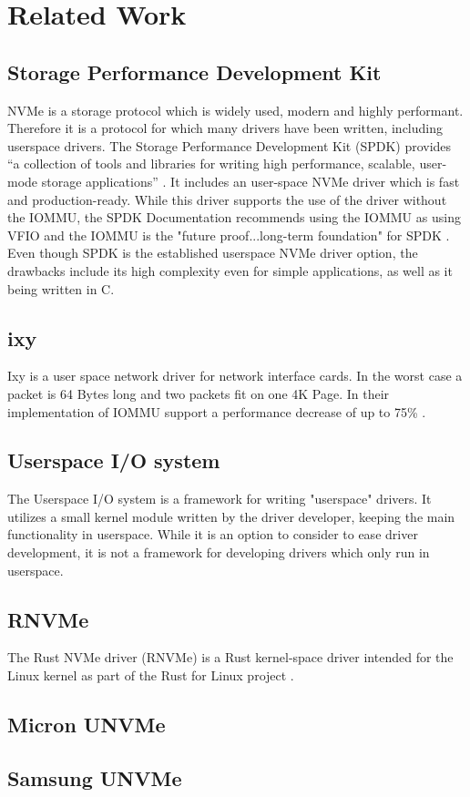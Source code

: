 \chapter{Related Work}

\section{Storage Performance Development Kit}
NVMe is a storage protocol which is widely used, modern and highly performant. Therefore it is a protocol for which many drivers have been written, including userspace drivers. The Storage Performance Development Kit (SPDK) provides ``a collection of tools and libraries for writing high performance, scalable, user-mode storage applications'' \cite{spdkindex}. It includes an user-space NVMe driver which is fast and production-ready. While this driver supports the use of the driver without the IOMMU, the SPDK Documentation recommends using the IOMMU as using VFIO and the IOMMU is the "future proof...long-term foundation" for SPDK \cite{spdkmemory}. Even though SPDK is the established userspace NVMe driver option, the drawbacks include its high complexity even for simple applications, as well as it being written in C.

\section{ixy} \label{s:ixy}
Ixy is a user space network driver for network interface cards. In the worst case a packet is 64 Bytes long and two packets fit on one 4K Page. In their implementation of IOMMU support a performance decrease of up to 75\% \cite{iommuhuber}.

\section{Userspace I/O system}
The Userspace I/O system is a framework for writing "userspace" drivers. It utilizes a small kernel module written by the driver developer, keeping the main functionality in userspace. While it is an option to consider to ease driver development, it is not a framework for developing drivers which only run in userspace.

\section{RNVMe}
The Rust NVMe driver (RNVMe) is a Rust kernel-space driver intended for the Linux kernel as part of the Rust for Linux project \cite{rnvmedriver}.

\section{Micron UNVMe}

\section{Samsung UNVMe}